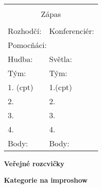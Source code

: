 \documentclass[a4paper,10pt,openany]{book}
\begin{document}
\begin{multicols}{2}

 \begin{tabular}[t]{|p{4cm}|p{4cm}    |}
 \hline
 \multicolumn{2}{|c|}{ } \\
 \multicolumn{2}{|c|}{\large{Zápas}} \\
 \multicolumn{2}{|c|}{ } \\
 
  \hline
Rozhodčí:  & Konferenciér: \\
 \hline
\multicolumn{2}{|l|}{ Pomocňáci: }   \\ \hline
Hudba: & Světla: \\ \hline \hline
Tým: &  Tým:\\ \hline
1. \small{(cpt)}  & 1.\small{(cpt)} \\ \hline
2.  & 2. \\ \hline
3. & 3. \\ \hline
4.  & 4. \\ \hline
Body:  & Body: \\ \hline

\end{tabular}
\vspace{3mm}

\end {multicols}
\renewcommand{\btbinfo}[6]{
\ifx Z#6  \else 
\large{#1 }

  \fi
}
\hline

\begin{multicols}{3}
\large{\textbf{Veřejné rozcvičky}}


\end {multicols}
\hline

\begin{multicols}{3}
\large{\textbf{Kategorie na improshow}}


\end {multicols}


\pagebreak
\newcommand{\faulinfo}[5]{
#4 & #1 & #3 & #5 \\

}

\begin{tabular}[t]{|p{3cm}|p{4cm}|p{1cm}|p{6cm}    |}

\end{tabular}
\pagebreak
\setcounter{tocdepth}{1}
\tableofcontents
\end{document}
